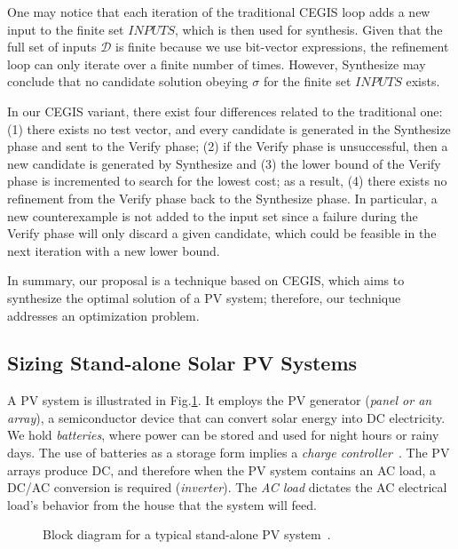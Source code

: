 \documentclass[10pt,journal,compsoc]{IEEEtran}
\begin{document}
One may notice that each iteration of the traditional CEGIS loop adds a new input to the finite set $INPUTS$, which is then used for synthesis. Given that the full set of inputs $\mathcal{D}$ is finite because we use bit-vector expressions, the refinement loop can only iterate over a finite number of times. However, {\sc Synthesize} may conclude that no candidate solution obeying $\sigma$ for the finite set $INPUTS$ exists. 

In our CEGIS variant, there exist four differences related to the traditional one: 
(1) there exists no test vector, and every candidate is generated in the {\sc Synthesize} phase and sent to the {\sc Verify} phase; 
(2) if the {\sc Verify} phase is unsuccessful, then a new candidate is generated by {\sc Synthesize} and 
(3) the lower bound of the {\sc Verify} phase is incremented to search for the lowest cost; as a result,
(4) there exists no refinement from the {\sc Verify} phase back to the {\sc Synthesize} phase. In particular, a new counterexample is not added to the {\sc input} set since a failure during the {\sc Verify} phase will only discard a given candidate, which could be feasible in the next iteration with a new lower bound.

In summary, our proposal is a technique based on CEGIS, which aims to synthesize the optimal solution of a PV system; therefore, our technique addresses an optimization problem.

\subsection{Sizing Stand-alone Solar PV Systems}
\label{sec:sizing}

A PV system is illustrated in Fig.\ref{fig:blockdiagram}. It employs the PV generator (\textit{panel or an array}), a semiconductor device that can convert solar energy into DC electricity. We hold \textit{batteries}, where power can be stored and used for night hours or rainy days. The use of batteries as a storage form implies a \textit{charge controller}~\cite{Hansen}. The PV arrays produce DC, and therefore when the PV system contains an AC load, a DC/AC conversion is required (\textit{inverter}). The \textit{AC load} dictates the AC electrical load's behavior from the house that the system will feed.
%
\begin{figure}[h]
\centering
\caption{Block diagram for a typical stand-alone PV system~\cite{Hansen}.}
\label{fig:blockdiagram} 
\end{figure}
\end{document}
